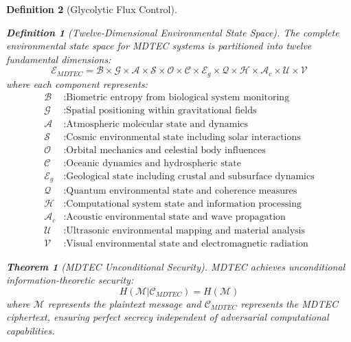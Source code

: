 \documentclass[12pt,a4paper]{article}
\newtheorem{theorem}{Theorem}
\newtheorem{definition}{Definition}
\begin{document}
\begin{definition}[Glycolytic Flux Control]
\begin{definition}[Twelve-Dimensional Environmental State Space]
The complete environmental state space for MDTEC systems is partitioned into twelve fundamental dimensions:
\begin{equation}
\mathcal{E}_{MDTEC} = \mathcal{B} \times \mathcal{G} \times \mathcal{A} \times \mathcal{S} \times \mathcal{O} \times \mathcal{C} \times \mathcal{E}_g \times \mathcal{Q} \times \mathcal{H} \times \mathcal{A}_c \times \mathcal{U} \times \mathcal{V}
\end{equation}
where each component represents:
\begin{align}
\mathcal{B} &: \text{Biometric entropy from biological system monitoring} \\
\mathcal{G} &: \text{Spatial positioning within gravitational fields} \\
\mathcal{A} &: \text{Atmospheric molecular state and dynamics} \\
\mathcal{S} &: \text{Cosmic environmental state including solar interactions} \\
\mathcal{O} &: \text{Orbital mechanics and celestial body influences} \\
\mathcal{C} &: \text{Oceanic dynamics and hydrospheric state} \\
\mathcal{E}_g &: \text{Geological state including crustal and subsurface dynamics} \\
\mathcal{Q} &: \text{Quantum environmental state and coherence measures} \\
\mathcal{H} &: \text{Computational system state and information processing} \\
\mathcal{A}_c &: \text{Acoustic environmental state and wave propagation} \\
\mathcal{U} &: \text{Ultrasonic environmental mapping and material analysis} \\
\mathcal{V} &: \text{Visual environmental state and electromagnetic radiation}
\end{align}
\end{definition}

\begin{theorem}[MDTEC Unconditional Security]
MDTEC achieves unconditional information-theoretic security:
\begin{equation}
H(\mathcal{M} | \mathcal{C}_{MDTEC}) = H(\mathcal{M})
\end{equation}
where $\mathcal{M}$ represents the plaintext message and $\mathcal{C}_{MDTEC}$ represents the MDTEC ciphertext, ensuring perfect secrecy independent of adversarial computational capabilities.
\end{theorem}


\end{definition}
\end{document}
